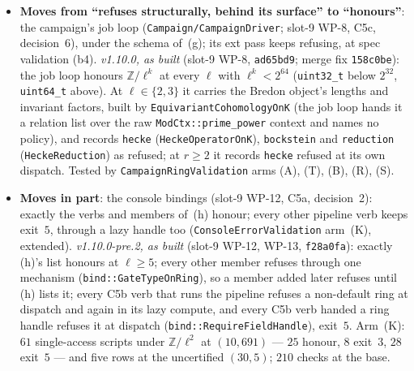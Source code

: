 \documentclass[11pt]{article}
\theoremstyle{remark}
\newcommand{\Z}{\mathbb{Z}}
\begin{document}
\begin{enumerate}[label=(b\arabic*)]
\begin{itemize}
  \item \textbf{Moves from ``refuses structurally, behind its surface'' to ``honours''}: the
    campaign's job loop (\texttt{Campaign/CampaignDriver}; slot-9 WP-8, C5c, decision~6), under the
    schema of~(g); its ext pass keeps refusing, at spec validation (b4). \emph{v1.10.0, as built}
    (slot-9 WP-8, \texttt{ad65bd9}; merge fix \texttt{158c0be}): the job loop honours
    $\Z/\ell^k$ at every $\ell$ with $\ell^k<2^{64}$ (\texttt{uint32\_t} below $2^{32}$,
    \texttt{uint64\_t} above). At $\ell\in\{2,3\}$ it carries the Bredon object's lengths and
    invariant factors, built by \texttt{EquivariantCohomologyOnK} (the job loop hands it a relation
    list over the raw \texttt{ModCtx::prime\_power} context and names no policy), and records
    \texttt{hecke} (\texttt{HeckeOperatorOnK}), \texttt{bockstein} and \texttt{reduction}
    (\texttt{HeckeReduction}) as refused; at $r\ge2$ it records \texttt{hecke} refused at its own
    dispatch. Tested by \texttt{CampaignRingValidation} arms (A), (T), (B), (R), (S).
  \item \textbf{Moves in part}: the console bindings (slot-9 WP-12, C5a, decision~2): exactly the
    verbs and members of~(h) honour; every other pipeline verb keeps exit~$5$, through a lazy handle
    too (\texttt{ConsoleErrorValidation} arm~(K), extended). \emph{v1.10.0-pre.2, as built}
    (slot-9 WP-12, WP-13, \texttt{f28a0fa}): exactly (h)'s list honours at $\ell\ge5$; every other
    member refuses through one mechanism (\texttt{bind::GateTypeOnRing}), so a member added later
    refuses until (h) lists it; every C5b verb that runs the pipeline refuses a non-default ring at
    dispatch and again in its lazy compute, and every C5b verb handed a ring handle refuses it at
    dispatch (\texttt{bind::RequireFieldHandle}), exit~$5$. Arm~(K): $61$ single-access scripts
    under $\Z/\ell^2$ at $(10,691)$ --- $25$ honour, $8$ exit~$3$, $28$ exit~$5$ --- and five rows at
    the uncertified $(30,5)$; $210$ checks at the base.
  \end{itemize}
  \endgroup


\end{enumerate}
\end{document}
